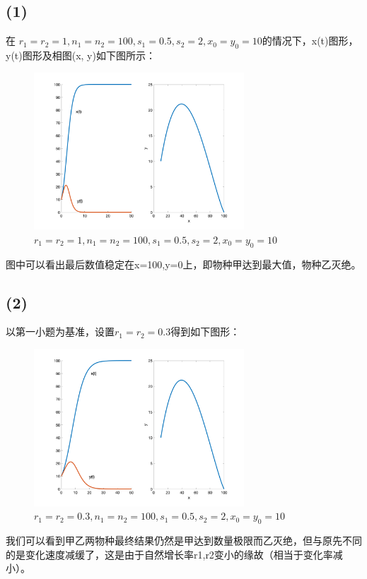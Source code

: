 \documentclass{article}
\begin{document}
\subsection{(1)}
在 $r_1=r_2=1, n_1=n_2=100, s_1=0.5, s_2=2, x_0=y_0=10$的情况下，x(t)图形，y(t)图形及相图(x, y)如下图所示：
\begin{figure}[H]
    \centering
    \includegraphics[width=0.7\textwidth]{pic91.png}
    \caption{$r_1=r_2=1, n_1=n_2=100, s_1=0.5, s_2=2, x_0=y_0=10$}
\end{figure}
图中可以看出最后数值稳定在x=100,y=0上，即物种甲达到最大值，物种乙灭绝。

\subsection{(2)}
以第一小题为基准，设置$r_1=r_2=0.3$得到如下图形：
\begin{figure}[H]
    \centering
    \includegraphics[width=0.7\textwidth]{pic92.png}
    \caption{$r_1=r_2=0.3, n_1=n_2=100, s_1=0.5, s_2=2, x_0=y_0=10$}
\end{figure}
我们可以看到甲乙两物种最终结果仍然是甲达到数量极限而乙灭绝，但与原先不同的是变化速度减缓了，这是由于自然增长率r1,r2变小的缘故（相当于变化率减小）。
\end{document}
